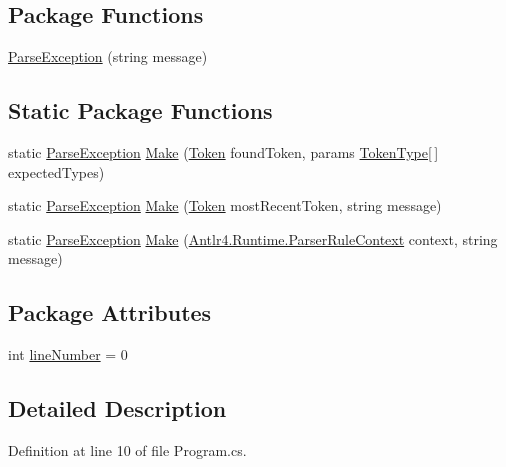 \subsection*{Package Functions}
\begin{DoxyCompactItemize}
\item 
\hyperlink{a00141_aa3c4f5c8b0ae86097bbc46044df9f317}{Parse\-Exception} (string message)
\end{DoxyCompactItemize}
\subsection*{Static Package Functions}
\begin{DoxyCompactItemize}
\item 
static \hyperlink{a00141}{Parse\-Exception} \hyperlink{a00141_a511a51bb42dc5bb107eb68f7e5cf5ff1}{Make} (\hyperlink{a00167}{Token} found\-Token, params \hyperlink{a00045_a301aa7c866593a5b625a8fc158bbeace}{Token\-Type}\mbox{[}$\,$\mbox{]} expected\-Types)
\item 
static \hyperlink{a00141}{Parse\-Exception} \hyperlink{a00141_a173f3cabc4741d9d9e016310e90c1c9f}{Make} (\hyperlink{a00167}{Token} most\-Recent\-Token, string message)
\item 
static \hyperlink{a00141}{Parse\-Exception} \hyperlink{a00141_a0265905b09fbd675d40c452d9fc61207}{Make} (\hyperlink{a00308_a7e45f8222713cb764832fd3c69d0268f}{Antlr4.\-Runtime.\-Parser\-Rule\-Context} context, string message)
\end{DoxyCompactItemize}
\subsection*{Package Attributes}
\begin{DoxyCompactItemize}
\item 
int \hyperlink{a00141_ab335169367e64fd6d89d58b3ac573751}{line\-Number} = 0
\end{DoxyCompactItemize}


\subsection{Detailed Description}


Definition at line 10 of file Program.\-cs.



